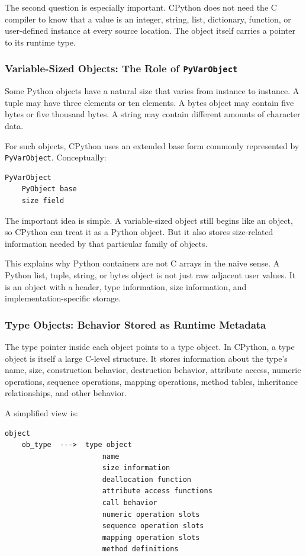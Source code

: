 The second question is especially important. CPython does not need the C compiler to know that a value is an integer, string, list, dictionary, function, or user-defined instance at every source location. The object itself carries a pointer to its runtime type.

\subsubsection{Variable-Sized Objects: The Role of \texttt{PyVarObject}}

Some Python objects have a natural size that varies from instance to instance. A tuple may have three elements or ten elements. A bytes object may contain five bytes or five thousand bytes. A string may contain different amounts of character data.

For such objects, CPython uses an extended base form commonly represented by \texttt{PyVarObject}. Conceptually:

\begin{verbatim}
PyVarObject
    PyObject base
    size field
\end{verbatim}

The important idea is simple. A variable-sized object still begins like an object, so CPython can treat it as a Python object. But it also stores size-related information needed by that particular family of objects.

This explains why Python containers are not C arrays in the naive sense. A Python list, tuple, string, or bytes object is not just raw adjacent user values. It is an object with a header, type information, size information, and implementation-specific storage.

\subsubsection{Type Objects: Behavior Stored as Runtime Metadata}

The type pointer inside each object points to a type object. In CPython, a type object is itself a large C-level structure. It stores information about the type's name, size, construction behavior, destruction behavior, attribute access, numeric operations, sequence operations, mapping operations, method tables, inheritance relationships, and other behavior.

A simplified view is:

\begin{verbatim}
object
    ob_type  --->  type object
                       name
                       size information
                       deallocation function
                       attribute access functions
                       call behavior
                       numeric operation slots
                       sequence operation slots
                       mapping operation slots
                       method definitions
\end{verbatim}

